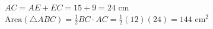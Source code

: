 \documentclass[preview]{standalone}
\begin{document}
\begin{align*}
AC = AE + EC = 15 + 9 = 24 \text{ cm} \\ \text{Area}(\triangle ABC) = \frac{1}{2} BC \cdot AC = \frac{1}{2}(12)(24) = 144 \text{ cm}^2
\end{align*}
\end{document}

